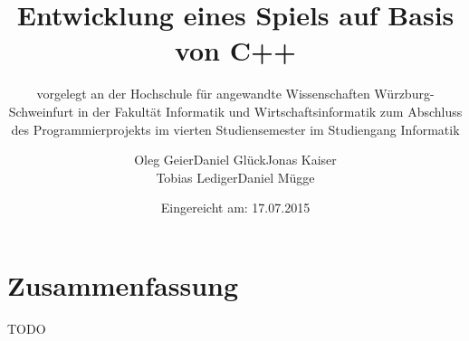 \documentclass[12pt,oneside,a4paper,parskip]{scrbook}
\def\BaAuthor{Oleg Geier\qquad Daniel Glück\qquad Jonas Kaiser \\Tobias Lediger\qquad Daniel Mügge}
\def\BaTitle{Entwicklung eines Spiels auf Basis von C++}
\def\BaSupervisorOne{Prof.\ Dr.\ Peter Braun}
\def\BaSupervisorTwo{Prof.\ Dr.\ Steffen Heinzl}
\def\BaDeadline{17.07.2015}
\begin{document}


\frontmatter
\titlehead{%
  {Hochschule für angewandte Wissenschaften Würzburg-Schweinfurt\\
   Fakultät Informatik und Wirtschaftsinformatik}}
\subject{Projektdokumentation}
\title{\BaTitle\\[15mm]}
\subtitle{\normalsize{vorgelegt an der Hochschule f\"{u}r angewandte Wissenschaften W\"{u}rzburg-Schweinfurt in der Fakult\"{a}t Informatik und Wirtschaftsinformatik zum Abschluss des Programmierprojekts im vierten Studiensemester im Studiengang Informatik}}
\author{\BaAuthor}
\date{\normalsize{Eingereicht am: \BaDeadline}}
\publishers{
  \normalsize{Erstpr\"{u}fer: \BaSupervisorOne}\\
  \normalsize{Zweitpr\"{u}fer: \BaSupervisorTwo}\\
}


\maketitle



\section*{Zusammenfassung}

TODO

\tableofcontents										



\mainmatter









\backmatter

\listoffigures
{}			

\listoftables


\printbibliography
{}				
\end{document}
